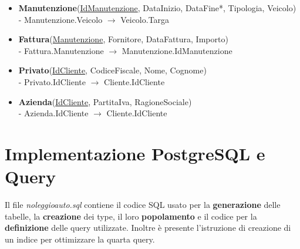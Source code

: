 \documentclass[10pt,a4paper]{article}
\begin{document}
\begin{itemize}
    \item \textbf{Manutenzione}(\underline{IdManutenzione}, DataInizio, DataFine*, Tipologia, Veicolo)
    \\
    - Manutenzione.Veicolo $\rightarrow$ Veicolo.Targa
    \item \textbf{Fattura}(\underline{Manutenzione}, Fornitore, DataFattura, Importo)
    \\
    - Fattura.Manutenzione $\rightarrow$ Manutenzione.IdManutenzione
    \item \textbf{Privato}(\underline{IdCliente}, CodiceFiscale, Nome, Cognome)
    \\
    - Privato.IdCliente $\rightarrow$ Cliente.IdCliente
    \item \textbf{Azienda}(\underline{IdCliente}, PartitaIva, RagioneSociale)
    \\
    - Azienda.IdCliente $\rightarrow$ Cliente.IdCliente
    
\end{itemize}

\section{Implementazione PostgreSQL e Query}
Il file \textit{noleggioauto.sql} contiene il codice SQL usato per la \textbf{generazione} delle tabelle, la \textbf{creazione} dei type, il loro \textbf{popolamento} e il codice per la \textbf{definizione} delle query utilizzate. Inoltre è presente l'istruzione di creazione di un indice per ottimizzare la quarta query.
\end{document}
